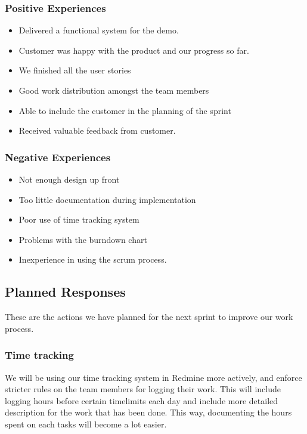 \subsubsection{Positive Experiences}

\begin{itemize}
\item Delivered a functional system for the demo.
\item Customer was happy with the product and our progress so far.
\item We finished all the user stories
\item Good work distribution amongst the team members
\item Able to include the customer in the planning of the sprint
\item Received valuable feedback from customer.
\end{itemize}

\subsubsection{Negative Experiences}
\begin{itemize}
\item Not enough design up front
\item Too little documentation during implementation 
\item Poor use of time tracking system
\item Problems with the burndown chart
\item Inexperience in using the scrum process.
\end{itemize}

\subsection{Planned Responses}
These are the actions we have planned for the next sprint to improve our work process.

\subsubsection{Time tracking}
We will be using our time tracking system in Redmine more actively, and enforce stricter rules on the team members for logging their work. This will include logging hours before certain timelimits each day and include more detailed description for the work that has been done. This way, documenting the hours spent on each tasks will become a lot easier.

